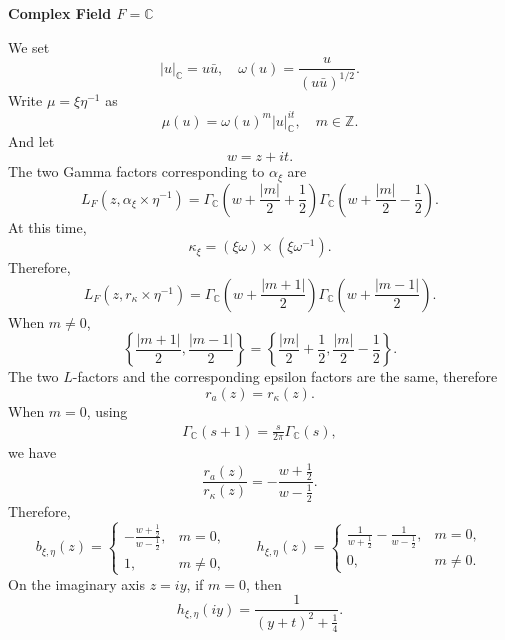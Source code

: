 \documentclass[11pt]{amsart}
\theoremstyle{definition}
\numberwithin{equation}{section}
\begin{document}
	\textbf{Complex Field \(F = \mathbb{C}\)}
	
	We set
	\[
	|u|_\mathbb{C} = u\bar{u}, \quad \omega(u) = \frac{u}{(u\bar{u})^{1/2}}.
	\]
	Write \(\mu = \xi \eta^{-1}\) as
	\[
	\mu(u) = \omega(u)^m |u|_\mathbb{C}^{it}, \quad m \in \mathbb{Z}.
	\]
	And let
	\[
	w = z + it.
	\]
	The two Gamma factors corresponding to \(\alpha_\xi\) are
	\begin{equation*}
		L_F(z, \alpha_\xi \times \eta^{-1}) = \Gamma_\mathbb{C}\left(w + \frac{|m|}{2} + \frac{1}{2}\right) \Gamma_\mathbb{C}\left(w + \frac{|m|}{2} - \frac{1}{2}\right).
	\end{equation*}
	At this time,
	\[
	\kappa_\xi = (\xi\omega) \times (\xi\omega^{-1}).
	\]
	Therefore,
	\begin{equation*}
		L_F(z, r_\kappa \times \eta^{-1}) = \Gamma_\mathbb{C}\left(w + \frac{|m+1|}{2}\right) \Gamma_\mathbb{C}\left(w + \frac{|m-1|}{2}\right).
	\end{equation*}
	When \(m \neq 0\),
	\[
	\left\{ \frac{|m+1|}{2}, \frac{|m-1|}{2} \right\} = \left\{ \frac{|m|}{2} + \frac{1}{2}, \frac{|m|}{2} - \frac{1}{2} \right\}.
	\]
	The two \(L\)-factors and the corresponding epsilon factors are the same, therefore
	\[
	r_a(z) = r_\kappa(z).
	\]
	When \(m = 0\), using
	\begin{align*}
		\Gamma_{\mathbb{C}}(s+1) = \frac{s}{2\pi} \Gamma_{\mathbb{C}}(s),
	\end{align*}
	we have
	\[
	\frac{r_a(z)}{r_\kappa(z)} =- \frac{w + \frac{1}{2}}{w - \frac{1}{2}}.
	\]
	Therefore,
	\begin{equation*}
		b_{\xi, \eta}(z) = \begin{cases} 
			-\frac{w + \frac{1}{2}}{w - \frac{1}{2}}, & m = 0, \\ 
			1, & m \neq 0,\qquad 
		\end{cases}
		h_{\xi, \eta}(z) = \begin{cases} 
			\frac{1}{w + \frac{1}{2}} - \frac{1}{w - \frac{1}{2}}, & m = 0, \\ 
			0, & m \neq 0.
		\end{cases}
	\end{equation*}
	On the imaginary axis \(z = iy\), if \(m = 0\), then
	\begin{equation*}
		h_{\xi, \eta}(iy) = \frac{1}{(y + t)^2 + \frac{1}{4}}.
	\end{equation*}
	
	
	
	
	
	
	
	
	
\end{document}

